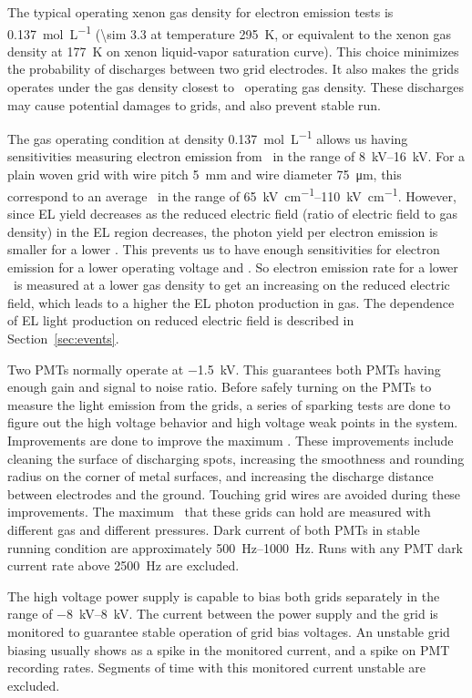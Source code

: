 The typical operating xenon gas density for electron emission tests is \SI{0.137}{\mole\per\liter}  (\SI{\sim 3.3}{\bara} at temperature \SI{295}{\kelvin}, or equivalent to the xenon gas density at \SI{177}{\kelvin} on xenon liquid-vapor saturation curve). 
This choice minimizes the probability of discharges between two grid electrodes. It also makes the grids operates under the gas density closest to \lze\ operating gas density. These discharges may cause potential damages to grids, and also prevent stable run. 

The gas operating condition at density \SI{0.137}{\mole\per\liter} allows us having sensitivities measuring electron emission from \opdv\ in the range of \SIrange{8}{16}{\kV}. For a plain woven grid with wire pitch \SI{5}{mm} and wire diameter \SI{75}{\um}, this correspond to an average \wsef\ in the range of \SIrange{65}{110}{\kV\per\cm}. However, since EL yield decreases as the reduced electric field (ratio of electric field to gas density) in the EL region decreases, the photon yield per electron emission is smaller for a lower \opdv . This prevents us to have enough sensitivities for electron emission for a lower operating voltage and \wsef . So electron emission rate for a lower \wsef\ is measured at a lower gas density to get an increasing on the reduced electric field, which leads to a higher the EL photon production in gas. The dependence of EL light production on reduced electric field is described in Section~\ref{sec:events}.

Two PMTs normally operate at \SI{-1.5}{\kV}. This guarantees both PMTs having enough gain and signal to noise ratio. Before safely turning on the PMTs to measure the light emission from the grids, a series of sparking tests are done to figure out the high voltage behavior and high voltage weak points in the system. Improvements are done to improve the maximum \opvtvb . These improvements include cleaning the surface of discharging spots, increasing the smoothness and rounding radius on the corner of metal surfaces, and increasing the discharge distance between electrodes and the ground. Touching grid wires are avoided during these improvements. The maximum \opvtvb\ that these grids can hold are measured with different gas and different pressures. Dark current of both PMTs in stable running condition are approximately \SIrange{500}{1000}{\Hz}. Runs with any PMT dark current rate above \SI{2500}{\Hz} are excluded. 

The high voltage power supply is capable to bias both grids separately in the range of \SIrange{-8}{8}{\kV}. The current between the power supply and the grid is monitored to guarantee stable operation of grid bias voltages. An unstable grid biasing usually shows as a spike in the monitored current, and a spike on PMT recording rates. Segments of time with this monitored current unstable are excluded.  

